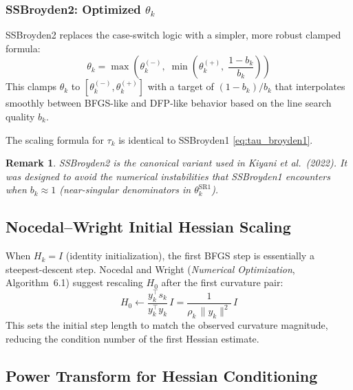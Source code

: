 \documentclass[11pt,a4paper]{article}
\newtheorem{remark}{Remark}[section]
\newcommand{\Hk}{H_k}
\newcommand{\sk}{s_k}
\newcommand{\yk}{y_k}
\newcommand{\tp}{\tau_k}
\newcommand{\thk}{\theta_k}
\begin{document}
\subsubsection{SSBroyden2: Optimized $\thk$}
\label{sec:ssbroyden2}

SSBroyden2 replaces the case-switch logic with a simpler, more robust
clamped formula:
\begin{equation}
\boxed{
  \thk = \max\!\left(\thk^{(-)},\;\min\!\left(\thk^{(+)},\;\frac{1-b_k}{b_k}\right)\right)
}
\label{eq:theta_broyden2}
\end{equation}
This clamps $\thk$ to $[\thk^{(-)}, \thk^{(+)}]$ with a target of
$(1-b_k)/b_k$ that interpolates smoothly between BFGS-like and DFP-like
behavior based on the line search quality $b_k$.

The scaling formula for $\tp$ is identical to SSBroyden1 \eqref{eq:tau_broyden1}.

\begin{remark}
SSBroyden2 is the \emph{canonical} variant used in
Kiyani et al.\ (2022).  It was designed to avoid the numerical
instabilities that SSBroyden1 encounters when $b_k \approx 1$
(near-singular denominators in $\thk^{\text{SR1}}$).
\end{remark}

\subsection{Nocedal--Wright Initial Hessian Scaling}
\label{sec:nw_scaling}

When $\Hk = I$ (identity initialization), the first BFGS step is
essentially a steepest-descent step.  Nocedal and Wright
(\textit{Numerical Optimization}, Algorithm~6.1) suggest rescaling
$H_0$ after the first curvature pair:
\begin{equation}
\boxed{
  H_0 \gets \frac{\yk^\top \sk}{\yk^\top \yk}\, I
  = \frac{1}{\rho_k \,\|\yk\|^2}\, I
}
\label{eq:nw_scale}
\end{equation}
This sets the initial step length to match the observed curvature
magnitude, reducing the condition number of the first Hessian estimate.

\subsection{Power Transform for Hessian Conditioning}
\label{sec:power_transform}
\end{document}
